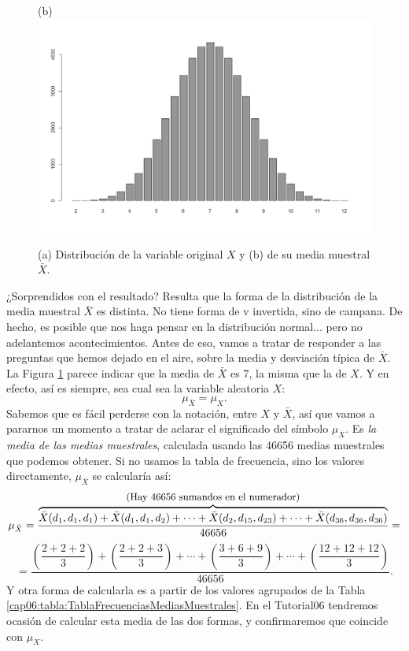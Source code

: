 \begin{ejemplo}
\begin{figure}[p]
\begin{center}
\begin{bn}
(b)\\
\includegraphics[width=12cm]{../fig/cap06-DistribucionOriginalVsMuestral-02-bn.png}
\end{bn}
\caption{(a) Distribución de la variable original $X$  y (b) de su media muestral $\bar X$.}
\label{cap06:fig:distribucionXvsMediasMuestrales}
\end{center}
\end{figure}

    ¿Sorprendidos con el resultado? Resulta que la forma de la distribución de la media muestral $\bar X$ es distinta. No tiene forma de v invertida, sino de campana. De hecho, es posible que nos haga pensar en la distribución normal... pero no adelantemos acontecimientos. Antes de eso, vamos a tratar de responder a las preguntas que hemos dejado en el aire, sobre la media y desviación típica de $\bar X$. La Figura \ref{cap06:fig:distribucionXvsMediasMuestrales} parece indicar que la media de $\bar X$ es $7$, la misma que la de $X$. Y en efecto, así es siempre, sea cual sea la variable aleatoria $X$:
        \[\mu_{\bar X}=\mu_X.\]
    Sabemos que es fácil perderse con la notación, entre $X$ y $\bar X$, así que vamos a pararnos un momento a tratar de aclarar el significado del símbolo $\mu_{\bar X}$. Es {\em la media de las medias muestrales}, calculada usando las 46656 medias muestrales que podemos obtener. Si no usamos la tabla de frecuencia, sino los valores directamente, $\mu_{\bar X}$ se calcularía así:
        \[\mu_{\bar X}=
        \dfrac{\overbrace{\bar X(d_1,d_1,d_1)+\bar X(d_1,d_1,d_2)+\cdots+\bar X(d_2,d_{15},d_{23})+\cdots+\bar X(d_{36},d_{36},d_{36})}^{\mbox{\small(Hay 46656 sumandos en el numerador)}} }{46656}=
        \]
        \[=\dfrac{\left(\dfrac{2+2+2}{3}\right)+\left(\dfrac{2+2+3}{3}\right)+\cdots+\left(\dfrac{3+6+9}{3}\right)+\cdots+\left(\dfrac{12+12+12}{3}\right)}{46656}.\]
    Y otra forma de calcularla es a partir de los valores agrupados de la Tabla \ref{cap06:tabla:TablaFrecuenciasMediasMuestrales}. En el Tutorial06 tendremos ocasión de calcular esta media de las dos formas, y confirmaremos que coincide con $\mu_X$.


\end{ejemplo}
